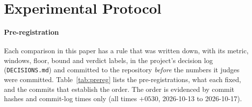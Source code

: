 \section{Experimental Protocol}
\label{sec:protocol}

\paragraph*{Pre-registration}
Each comparison in this paper has a rule that was written down, with its metric, windows, floor, bound and verdict labels, in the project's decision log (\texttt{DECISIONS.md}) and committed to the repository \emph{before} the numbers it judges were committed.
Table~\ref{tab:prereg} lists the pre-registrations, what each fixed, and the commits that establish the order.
The order is evidenced by commit hashes and commit-log times only (all times $+0530$, 2026-10-13 to 2026-10-17).

